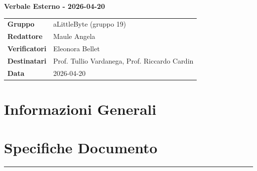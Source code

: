 \documentclass[a4paper,12pt]{article}
\begin{document}
\thispagestyle{firstpage}

\vspace*{0.5cm}

\begin{center}
    {\LARGE \textbf{Verbale Esterno - 2026-04-20}}
\end{center}

\vspace{1.5cm}

\begin{center}
    \renewcommand{\arraystretch}{1.3}
    \begin{tcolorbox}[
        width=0.92\textwidth,
        colback=gray!6,
        colframe=gray!45,
        boxrule=0.5pt,
        arc=2mm,
        boxsep=0pt,
        left=8pt, right=8pt, top=8pt, bottom=8pt
    ]
        \begin{tabularx}{\linewidth}{>{\bfseries}p{3.5cm} X}
            Gruppo      & aLittleByte (gruppo 19) \\
            Redattore   & Maule Angela \\
            Verificatori& Eleonora Bellet\\
            Destinatari & Prof. Tullio Vardanega, Prof. Riccardo Cardin \\
            Data        &  2026-04-20\\
        \end{tabularx}
    \end{tcolorbox}
\end{center}

\newpage

\tableofcontents
\newpage

\section{Informazioni Generali}
\section*{Specifiche Documento}
\hrule
\vspace{1cm}
\end{document}
